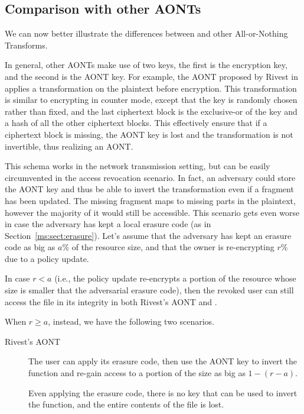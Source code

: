 {\subsection{Comparison with other AONTs}

We can now better illustrate the differences between \name and other All-or-Nothing Transforms.

In general, other AONTs make use of two keys, the first is the encryption key, and the second is the AONT key. For example, the AONT proposed by Rivest in \cite{r97} applies a transformation on the plaintext before encryption. This transformation is similar to encrypting in counter mode, except that the key is randomly chosen rather than fixed, and the last ciphertext block is the exclusive-or of the key and a hash of all the other ciphertext blocks. This effectively ensure that if a ciphertext block is missing, the AONT key is lost and the transformation is not invertible, thus realizing an AONT.

This schema works in the network transmission setting, but can be easily circumvented in the access revocation scenario. In fact, an adversary could store the AONT key and thus be able to invert the transformation even if a fragment has been updated. The missing fragment maps to missing parts in the plaintext, however the majority of it would still be accessible.
This scenario gets even worse in case the adversary has kept a local erasure code (as in Section~\ref{ms:sect:erasure}). Let's assume that the adversary has kept an erasure code as big as $a\%$ of the resource size, and that the owner is re-encrypting $r\%$ due to a policy update.

In case $r < a$ (i.e., the policy update re-encrypts a portion of the resource whose size is smaller that the adversarial erasure code), then the revoked user can still access the file in its integrity in both Rivest's AONT and \name.

\noindent When $r \geq a$, instead, we have the following two scenarios.

\begin{description}
	\item [Rivest's AONT] The user can apply its erasure code, then use the AONT key to invert the function and re-gain access to a portion of the size as big as $1 - (r - a)$.
	\item [\name] Even applying the erasure code, there is no key that can be used to invert the function, and the entire contents of the file is lost.
\end{description}

}
